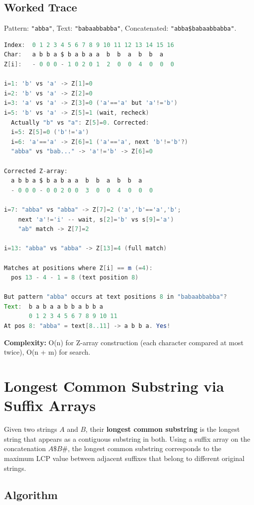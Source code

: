 \subsection{Worked Trace}

Pattern: \texttt{"abba"}, Text: \texttt{"babaabbabba"}, Concatenated: \texttt{"abba\$babaabbabba"}.

\begin{lstlisting}[language=Java]
Index:  0 1 2 3 4 5 6 7 8 9 10 11 12 13 14 15 16
Char:   a b b a $ b a b a a  b  b  a  b  b  a
Z[i]:   - 0 0 0 - 1 0 2 0 1  2  0  0  4  0  0  0

i=1: 'b' vs 'a' -> Z[1]=0
i=2: 'b' vs 'a' -> Z[2]=0
i=3: 'a' vs 'a' -> Z[3]=0 ('a'=='a' but 'a'!='b')
i=5: 'b' vs 'a' -> Z[5]=1 (wait, recheck)
  Actually "b" vs "a": Z[5]=0. Corrected:
  i=5: Z[5]=0 ('b'!='a')
  i=6: 'a'=='a' -> Z[6]=1 ('a'=='a', next 'b'!='b'?)
  "abba" vs "bab..." -> 'a'!='b' -> Z[6]=0

Corrected Z-array:
  a b b a $ b a b a a  b  b  a  b  b  a
  - 0 0 0 - 0 0 2 0 0  3  0  0  4  0  0  0

i=7: "abba" vs "abba" -> Z[7]=2 ('a','b'=='a','b';
    next 'a'!='i' -- wait, s[2]='b' vs s[9]='a')
    "ab" match -> Z[7]=2

i=13: "abba" vs "abba" -> Z[13]=4 (full match)

Matches at positions where Z[i] == m (=4):
  pos 13 - 4 - 1 = 8 (text position 8)

But pattern "abba" occurs at text positions 8 in "babaabbabba"?
Text:  b a b a a b b a b b a
       0 1 2 3 4 5 6 7 8 9 10 11
At pos 8: "abba" = text[8..11] -> a b b a. Yes!
\end{lstlisting}

\textbf{Complexity:} O(n) for Z-array construction (each character compared at most twice), O(n + m) for search.

\section{Longest Common Substring via Suffix Arrays}

Given two strings $A$ and $B$, their \textbf{longest common substring} is the longest string that appears as a contiguous substring in both. Using a suffix array on the concatenation $A\$B\#$, the longest common substring corresponds to the maximum LCP value between adjacent suffixes that belong to different original strings.

\subsection{Algorithm}

